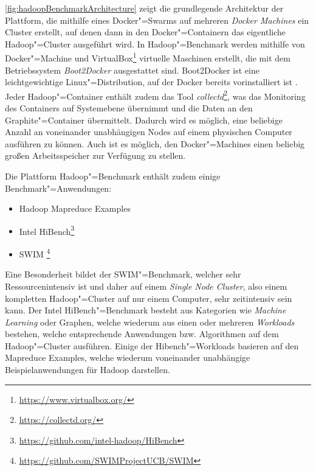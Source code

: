 \autoref{fig:hadoopBenchmarkArchitecture} zeigt die grundlegende Architektur der Plattform, die mithilfe eines Docker"=Swarms auf mehreren \emph{Docker Machines} ein Cluster erstellt, auf denen dann in den Docker"=Containern das eigentliche Hadoop"=Cluster ausgeführt wird.
In Hadoop"=Benchmark werden mithilfe von Docker"=Machine und VirtualBox\footnote{\url{https://www.virtualbox.org/}} virtuelle Maschinen erstellt, die mit dem  Betriebssystem \emph{Boot2Docker} ausgestattet sind.
Boot2Docker ist eine leichtgewichtige Linux"=Distribution, auf der Docker bereits vorinstalliert ist \cite{DockerMachineGettingStartedVm}.
Jeder Hadoop"=Container enthält zudem das Tool \emph{collectd}\footnote{\url{https://collectd.org/}}, was das Monitoring des Containers auf Systemebene übernimmt und die Daten an den Graphite"=Container übermittelt.
Dadurch wird es möglich, eine beliebige Anzahl an voneinander unabhängigen Nodes auf einem physischen Computer ausführen zu können.
Auch ist es möglich, den Docker"=Machines einen beliebig großen Arbeitsspeicher zur Verfügung zu stellen.

Die Plattform Hadoop"=Benchmark enthält zudem einige Benchmark"=Anwendungen:

\begin{itemize}
    \item Hadoop Mapreduce Examples
    \item Intel HiBench\footnote{\url{https://github.com/intel-hadoop/HiBench}}
    \item \ac{SWIM} \footnote{\url{https://github.com/SWIMProjectUCB/SWIM}}
\end{itemize}

Eine Besonderheit bildet der SWIM"=Benchmark, welcher sehr Ressourcenintensiv ist und daher auf einem \emph{Single Node Cluster}, also einem kompletten Hadoop"=Cluster auf nur einem Computer, sehr zeitintensiv sein kann.
Der Intel HiBench"=Benchmark besteht aus Kategorien wie \emph{Machine Learning} oder Graphen, welche wiederum aus einen oder mehreren \emph{Workloads} bestehen, welche entsprechende Anwendungen bzw. Algorithmen auf dem Hadoop"=Cluster ausführen.
Einige der Hibench"=Workloads basieren auf den Mapreduce Examples, welche wiederum voneinander unabhängige Beispielanwendungen für Hadoop darstellen.